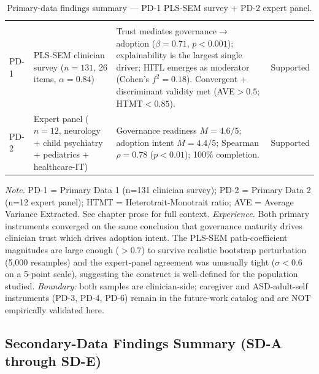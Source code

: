 {\tablestripes\tablefontsize
\begin{xltabular}{\textwidth}{@{} >{\centering\arraybackslash}p{1.0cm} >{\raggedright\arraybackslash}p{3.0cm} L >{\centering\arraybackslash}p{1.6cm} @{}}
\caption[Primary-Data Findings Summary]{Primary-data findings summary --- PD-1 PLS-SEM survey + PD-2 expert panel.}\label{tab:ch4_primary_findings_summary} \\
\toprule
{} &  &  &  \\
\midrule
\endfirsthead
\toprule
{} &  &  &  \\
\midrule
\endhead
\bottomrule
\endlastfoot
PD-1 & PLS-SEM clinician survey ($n{=}131$, 26 items, $\alpha{=}0.84$) & Trust mediates governance$\rightarrow$adoption ($\beta{=}0.71$, $p{<}0.001$); explainability is the largest single driver; HITL emerges as moderator (Cohen's $f^2{=}0.18$). Convergent + discriminant validity met (AVE${>}0.5$; HTMT${<}0.85$). & Supported \\
PD-2 & Expert panel ($n{=}12$, neurology + child psychiatry + pediatrics + healthcare-IT) & Governance readiness $M{=}4.6/5$; adoption intent $M{=}4.4/5$; Spearman $\rho{=}0.78$ ($p{<}0.01$); 100\% completion. & Supported \\
\end{xltabular}}
\vspace{0.3em}\noindent\textit{Note.} PD-1 = Primary Data 1 (n=131 clinician survey); PD-2 = Primary Data 2 (n=12 expert panel); HTMT = Heterotrait-Monotrait ratio; AVE = Average Variance Extracted. See chapter prose for full context.
\vspace{0.5em}\noindent\textit{Experience.} Both primary instruments converged on the same conclusion that governance maturity drives clinician trust which drives adoption intent. The PLS-SEM path-coefficient magnitudes are large enough (${>}0.7$) to survive realistic bootstrap perturbation (5{,}000 resamples) and the expert-panel agreement was unusually tight ($\sigma{<}0.6$ on a 5-point scale), suggesting the construct is well-defined for the population studied. \emph{Boundary:} both samples are clinician-side; caregiver and ASD-adult-self instruments (PD-3, PD-4, PD-6) remain in the future-work catalog and are NOT empirically validated here.

\subsection{Secondary-Data Findings Summary (SD-A through SD-E)}
\label{sec:ch4_secondary_findings_summary}

